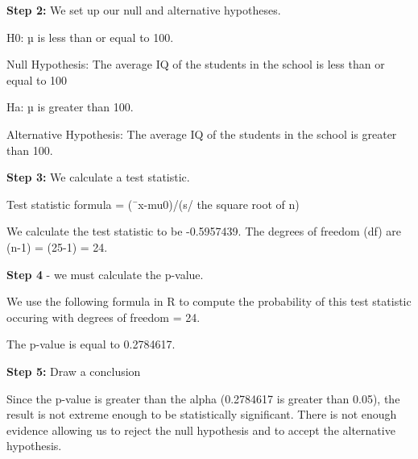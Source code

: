 \documentclass[12pt,letterpaper]{article}
\begin{document}
\noindent
\textbf{Step 2:} We set up our null and alternative hypotheses.
\\\vspace{.5cm}

\noindent
H0: µ is less than or equal to 100. 

\noindent
Null Hypothesis: The average IQ of the students in the school is less than or equal to 100



\noindent
Ha: µ is greater than 100.  

\noindent
Alternative Hypothesis: The average IQ of the students in the school is greater than 100.



\noindent
\textbf{Step 3:} We calculate a test statistic.

\noindent
Test statistic formula = (¯x-mu0)/(s/ the square root of n)



\noindent
We calculate the test statistic to be -0.5957439. 
The degrees of freedom (df) are (n-1) = (25-1) = 24.
\\\vspace{.5cm}

\noindent
\textbf{Step 4} - we must calculate the p-value.
\\\vspace{.5cm}

\noindent
We use the following formula in R to compute the probability of this test statistic occuring with degrees of freedom = 24.



\noindent
The p-value is equal to 0.2784617.
\\\vspace{.5cm}

\noindent
\textbf{Step 5:} Draw a conclusion
\\\vspace{.5cm}

\noindent
Since the p-value is greater than the alpha (0.2784617 is greater than 0.05), the result is not extreme enough to be statistically significant. There is not enough evidence allowing us to reject the null hypothesis and to accept the alternative hypothesis.
\\\vspace{.5cm}
\end{document}
